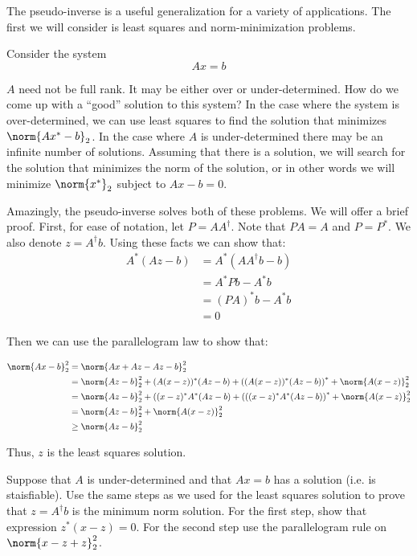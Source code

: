 

The pseudo-inverse is a useful generalization for a variety of applications. The first we will consider is least squares and norm-minimization problems.

Consider the system
\[
Ax = b
\]

$A$ need not be full rank. It may be either over or under-determined. How do we come up with a ``good'' solution to this system? In the case where the system is over-determined, we can use least squares to find the solution that minimizes $\norm{Ax^* - b}_2$. In the case where $A$ is under-determined there may be an infinite number of solutions. Assuming that there is a solution, we will search for the solution that minimizes the norm of the solution, or in other words we will minimize $\norm{x^*}_2$ subject to $Ax-b = 0$.

Amazingly, the pseudo-inverse solves both of these problems. We will offer a brief proof. First, for ease of notation, let $P = A A^\dagger$. Note that $PA = A$ and $P = P^*$. We also denote $z = A^\dagger b$. Using these facts we can show that:
\begin{align*}
A^*(Az-b) &= A^*(A A^\dagger b - b) \\
&= A^*P b - A^* b \\
&= (PA)^* b - A^* b \\
&= 0
\end{align*}

Then we can use the parallelogram law to show that:

\begin{align*}
\norm{Ax-b}_2^2 &= \norm{Ax + Az-Az-b}_2^2 \\
&= \norm{Az-b}_2^2 + (A(x-z))^*(Az-b) + \left((A(x-z))^*(Az-b)\right)^* + \norm{A(x-z)}_2^2 \\
&= \norm{Az-b}_2^2 + ((x-z)^*A^*(Az-b) + \left(((x-z)^*A^*(Az-b)\right)^* + \norm{A(x-z)}_2^2 \\
&= \norm{Az-b}_2^2 + \norm{A(x-z)}_2^2 \\
&\geq \norm{Az-b}_2^2
\end{align*}

Thus, $z$ is the least squares solution.
\begin{problem}
Suppose that $A$ is under-determined and that $Ax = b$ has a solution (i.e. is staisfiable). Use the same steps as we used for the least squares solution to prove that $z = A^\dagger b$ is the minimum norm solution. For the first step, show that expression $z^*(x-z) = 0$. For the second step use the parallelogram rule on $\norm{x -z +z}_2^2$.
\end{problem}


